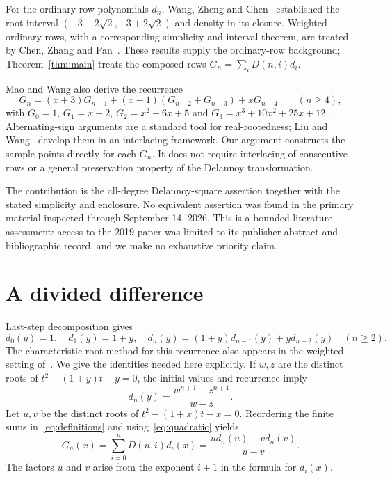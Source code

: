\documentclass[11pt]{article}
\begin{document}
For the ordinary row polynomials $d_n$, Wang, Zheng and
Chen~\cite{WangZhengChen2019} established the root interval
$(-3-2\sqrt2,-3+2\sqrt2)$ and density in its closure. Weighted ordinary
rows, with a corresponding simplicity and interval theorem, are treated by
Chen, Zhang and Pan~\cite[Theorem~1]{ChenZhangPan2026}. These results supply
the ordinary-row background; Theorem~\ref{thm:main} treats the composed rows
$G_n=\sum_i D(n,i)d_i$.

Mao and Wang also derive the recurrence
\begin{equation}\label{eq:fourterm}
 G_n=(x+3)G_{n-1}+(x-1)(G_{n-2}+G_{n-3})+xG_{n-4}
 \qquad(n\geq4),
\end{equation}
with $G_0=1$, $G_1=x+2$, $G_2=x^2+6x+5$ and
$G_3=x^3+10x^2+25x+12$~\cite[Section~4]{MaoWang2026}.
Alternating-sign arguments are a standard tool for real-rootedness;
Liu and Wang~\cite[Theorem~2.1 and its proof]{LiuWang2007} develop them
in an interlacing framework. Our argument constructs the sample points
directly for each $G_n$. It does not require interlacing of consecutive
rows or a general preservation property of the Delannoy transformation.

The contribution is the all-degree Delannoy-square assertion together with
the stated simplicity and enclosure. No equivalent assertion was found in
the primary material inspected through September 14, 2026. This is a bounded
literature assessment: access to the 2019 paper was limited to its publisher
abstract and bibliographic record, and we make no exhaustive priority claim.

\section{A divided difference}

Last-step decomposition gives
\begin{equation}\label{eq:ordinary}
 d_0(y)=1,\quad d_1(y)=1+y,\quad
 d_n(y)=(1+y)d_{n-1}(y)+y d_{n-2}(y)\quad(n\geq2).
\end{equation}
The characteristic-root method for this recurrence also appears in the
weighted setting of~\cite[Section~2]{ChenZhangPan2026}. We give the
identities needed here explicitly. If $w,z$ are the distinct roots of
$t^2-(1+y)t-y=0$, the initial values and recurrence imply
\begin{equation}\label{eq:quadratic}
 d_n(y)=\frac{w^{n+1}-z^{n+1}}{w-z}.
\end{equation}
Let $u,v$ be the distinct roots of $t^2-(1+x)t-x=0$. Reordering the
finite sums in~\eqref{eq:definitions} and using~\eqref{eq:quadratic} yields
\begin{equation}\label{eq:divided}
 G_n(x)=\sum_{i=0}^n D(n,i)d_i(x)
       =\frac{u d_n(u)-v d_n(v)}{u-v}.
\end{equation}
The factors $u$ and $v$ arise from the exponent $i+1$ in the formula
for $d_i(x)$.
\end{document}
